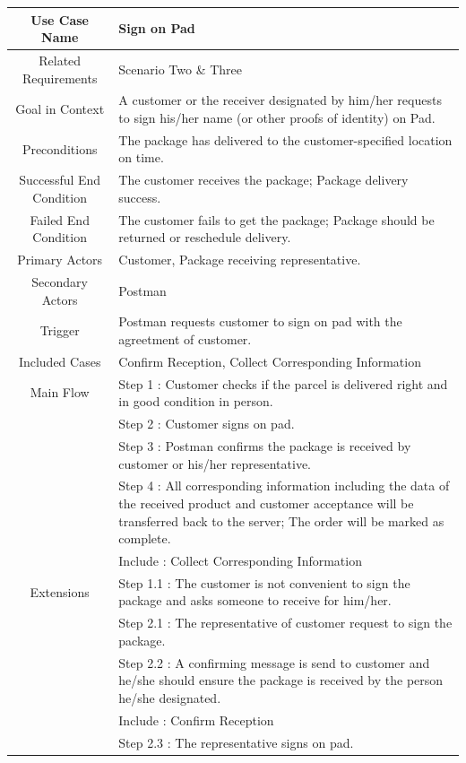 \documentclass[12pt]{scrreprt}
\begin{document}
\begin{table}
  \centering
  \begin{tabular}{| c | p{11cm} |}
    \hline
    Use Case Name & Sign on Pad\\
    \hline
    Related Requirements & Scenario Two \& Three\\
    \hline
    Goal in Context & A customer or the receiver designated by him/her requests
    to sign his/her name (or other proofs of identity) on Pad.\\
    \hline
    Preconditions & The package has delivered to the customer-specified
    location on time.\\
    \hline
    Successful End Condition & The customer receives the package; Package
    delivery success.\\
    \hline
    Failed End Condition & The customer fails to get the package; Package
    should be returned or reschedule delivery.\\
    \hline
    Primary Actors & Customer, Package receiving representative.\\
    \hline
    Secondary Actors & Postman\\
    \hline
    Trigger & Postman requests customer to sign on pad with the agreetment of
    customer.\\
    \hline
    Included Cases & Confirm Reception, Collect Corresponding Information\\
    \hline
    Main Flow & Step 1 : Customer checks if the parcel is delivered right
    and in good condition in person.\\
    & Step 2 : Customer signs on pad.\\
    & Step 3 : Postman confirms the package is received by customer or his/her
    representative.\\
    & Step 4 : All corresponding information including the data of the received
    product and customer acceptance will be transferred back to the server;
    The order will be marked as complete.\\
    & Include : Collect Corresponding Information\\
    \hline
    Extensions & Step 1.1 : The customer is not convenient to sign the package
    and asks someone to receive for him/her.\\
    & Step 2.1 : The representative of customer request to sign the package.\\
    & Step 2.2 : A confirming message is send to customer and he/she should
    ensure the package is received by the person he/she designated.\\
    & Include : Confirm Reception\\
    & Step 2.3 : The representative signs on pad.\\
    \hline
  \end{tabular}
\end{table}
\end{document}
